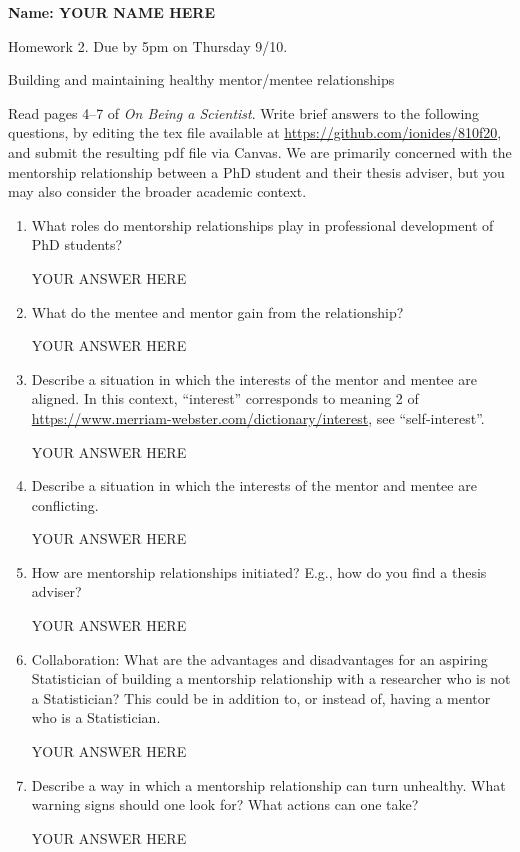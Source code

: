 \documentclass[12pt]{article}
\begin{document}
\begin{center}\bf
Name: YOUR NAME HERE

Homework 2. Due by 5pm on Thursday 9/10.

Building and maintaining healthy mentor/mentee relationships

\end{center}

Read pages 4--7 of {\em On Being a Scientist}. Write brief answers to the following questions, by editing the tex file available at \url{https://github.com/ionides/810f20}, and submit the resulting pdf file via Canvas. We are primarily concerned with the mentorship relationship between a PhD student and their thesis adviser, but you may also consider the broader academic context.

\begin{enumerate}
\item What roles do mentorship relationships play in professional development of PhD students? 

YOUR ANSWER HERE

\item What do the mentee and mentor gain from the relationship?

YOUR ANSWER HERE

\item Describe a situation in which the interests of the mentor and mentee are aligned. In this context, ``interest'' corresponds to meaning 2 of \url{https://www.merriam-webster.com/dictionary/interest}, see ``self-interest''.


YOUR ANSWER HERE

\item Describe a situation in which the interests of the mentor and mentee are conflicting. 

YOUR ANSWER HERE

\item How are mentorship relationships initiated? E.g., how do you find a thesis adviser?

YOUR ANSWER HERE

\item Collaboration: What are the advantages and disadvantages for an aspiring Statistician of building a mentorship relationship with a researcher who is not a Statistician? This could be in addition to, or instead of, having a mentor who is a Statistician.

YOUR ANSWER HERE

\item Describe a way in which a mentorship relationship can turn unhealthy. What warning signs should one look for? What actions can one take?

YOUR ANSWER HERE

\end{enumerate}
\end{document}
